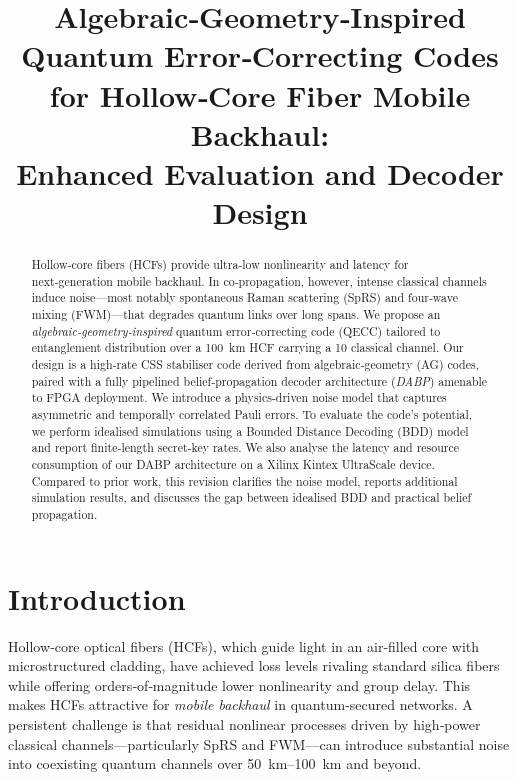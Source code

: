 \documentclass[conference]{IEEEtran}
\begin{document}
\title{Algebraic‑Geometry‑Inspired Quantum Error‑Correcting Codes for Hollow‑Core Fiber Mobile Backhaul:\\Enhanced Evaluation and Decoder Design}

\author{}

\maketitle

\begin{abstract}
Hollow‑core fibers (HCFs) provide ultra‑low nonlinearity and latency for next‑generation mobile backhaul.  In co‑propagation, however, intense classical channels induce noise—most notably spontaneous Raman scattering (SpRS) and four‑wave mixing (FWM)—that degrades quantum links over long spans.  We propose an \emph{algebraic‑geometry‑inspired} quantum error‑correcting code (QECC) tailored to entanglement distribution over a \SI{100}{\kilo\meter} HCF carrying a \SI{10}{\dBm} classical channel.  Our design is a high‑rate CSS stabiliser code derived from algebraic‑geometry (AG) codes, paired with a fully pipelined belief‑propagation decoder architecture (\emph{DABP}) amenable to FPGA deployment.  We introduce a physics‑driven noise model that captures asymmetric and temporally correlated Pauli errors.  To evaluate the code's potential, we perform idealised simulations using a Bounded Distance Decoding (BDD) model and report finite‑length secret‑key rates.  We also analyse the latency and resource consumption of our DABP architecture on a Xilinx Kintex UltraScale device.  Compared to prior work, this revision clarifies the noise model, reports additional simulation results, and discusses the gap between idealised BDD and practical belief propagation.
\end{abstract}

\section{Introduction}
Hollow‑core optical fibers (HCFs), which guide light in an air‑filled core with microstructured cladding, have achieved loss levels rivaling standard silica fibers while offering orders‑of‑magnitude lower nonlinearity and group delay.  This makes HCFs attractive for \emph{mobile backhaul} in quantum‑secured networks.  A persistent challenge is that residual nonlinear processes driven by high‑power classical channels—particularly SpRS and FWM—can introduce substantial noise into coexisting quantum channels over \SIrange{50}{100}{\kilo\meter} and beyond.
\end{document}
